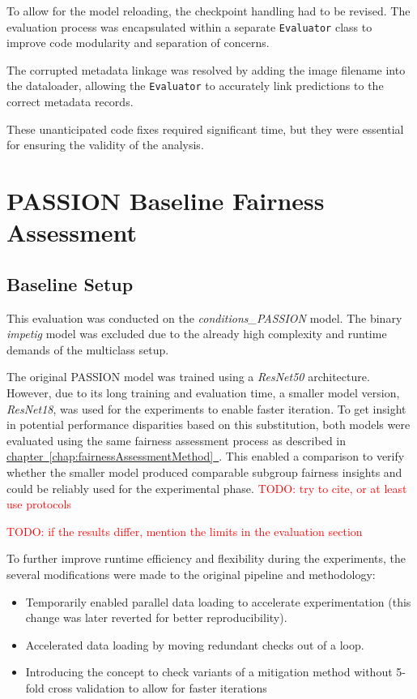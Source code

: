 \documentclass[12pt, a4paper, oneside]{book}   	%
\renewcommand{\todo}[1]{\textcolor{red}{TODO: #1}}
\newcommand{\linkchap}[1]{\hyperref[#1]{chapter~\ref{#1}~\nameref{#1}}}
\begin{document}
		To allow for the model reloading, the checkpoint handling had to be revised. The evaluation process was encapsulated within a separate \texttt{Evaluator} class to improve code modularity and separation of concerns.
		
		The corrupted metadata linkage was resolved by adding the image filename into the dataloader, allowing the \texttt{Evaluator} to accurately link predictions to the correct metadata records.
		
		These unanticipated code fixes required significant time, but they were essential for ensuring the validity of the analysis.

		
		\section{PASSION Baseline Fairness Assessment} \label{chap:PASSIONFairnessAssessmentBaselineExecution}
		
		\subsection{Baseline Setup}
		This evaluation was conducted on the \textit{conditions\_PASSION} model. The binary \textit{impetig} model was excluded due to the already high complexity and runtime demands of the multiclass setup.
		
		The original PASSION model was trained using a \textit{ResNet50} architecture. However, due to its long training and evaluation time, a smaller model version, \textit{ResNet18}, was used for the experiments to enable faster iteration. To get insight in potential performance disparities based on this substitution, both models were evaluated using the same fairness assessment process as described in \linkchap{chap:fairnessAssessmentMethod}. This enabled a comparison to verify whether the smaller model produced comparable subgroup fairness insights and could be reliably used for the experimental phase.
		\todo{try to cite, or at least use protocols}
		
		\todo{if the results differ, mention the limits in the evaluation section}
		
		To further improve runtime efficiency and flexibility during the experiments, the several modifications were made to the original pipeline and methodology:
		
		\begin{itemize}
			\item Temporarily enabled parallel data loading to accelerate experimentation (this change was later reverted for better reproducibility).
			\item Accelerated data loading by moving redundant checks out of a loop.
			\item Introducing the concept to check variants of a mitigation method without 5-fold cross validation to allow for faster iterations
		\end{itemize}
		
\end{document}
